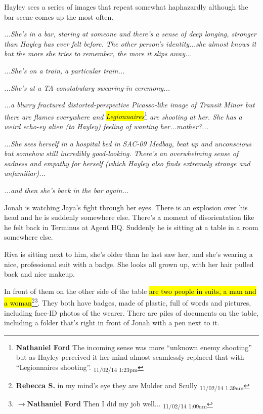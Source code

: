 Hayley sees a series of images that repeat somewhat haphazardly although the bar scene comes up the most often.

\textit{...She's in a bar, staring at someone and there's a sense of deep longing, stronger than Hayley has ever felt before.  The other person's identity...she almost knows it but the more she tries to remember, the more it slips away... }

\textit{...She's on a train, a particular train...}

\textit{...She's at a TA constabulary swearing-in ceremony...}

\textit{...a blurry fractured distorted-perspective Picasso-like image of Transit Minor but there are flames everywhere and }\textit{\hl{Legionnaires}}\footnote{\textbf{Nathaniel Ford }The incoming sense was more ``unknown enemy shooting'' but as Hayley perceived it her mind almost seamlessly replaced that with ``Legionnaires shooting''. \textsubscript{11/02/14 1:23pm}}\textit{ are shooting at her.  She has a weird echo-ey alien (to Hayley) feeling of wanting her...mother?...}

\textit{...She sees herself in a hospital bed in SAC-09 Medbay, beat up and unconscious but somehow still incredibly good-looking.  There's an overwhelming sense of sadness and empathy for herself (which Hayley also finds extremely strange and unfamiliar)...}

\textit{...and then she's back in the bar again...}



Jonah is watching Jaya's fight through her eyes.  There is an explosion over his head and he is suddenly somewhere else.  There's a moment of disorientation like he felt back in Terminus at Agent HQ.  Suddenly he is sitting at a table in a room somewhere else.  

Riva is sitting next to him, she's older than he last saw her, and she's wearing a nice, professional suit with a badge.  She looks all grown up, with her hair pulled back and nice makeup.

In front of them on the other side of the table \hl{are two people in suits, a man and a woman}\footnote{\textbf{Rebecca S. }in my mind's eye they are Mulder and Scully \textsubscript{11/02/14 1:39am}}\footnote{$\rightarrow$\textbf{Nathaniel Ford }Then I did my job well... \textsubscript{11/02/14 1:09am}}.  They both have badges, made of plastic, full of words and pictures, including face-ID photos of the wearer. There are piles of documents on the table, including a folder that's right in front of Jonah with a pen next to it.  

